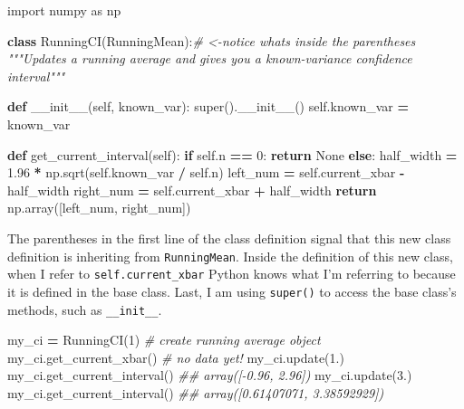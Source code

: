 \documentclass[
  12pt,
  krantz2]{krantz}
\makeatletter
\newenvironment{Shaded}{\begin{snugshade}}{\end{snugshade}}
\newcommand{\BuiltInTok}[1]{#1}
\newcommand{\CommentTok}[1]{\textcolor[rgb]{0.37,0.37,0.37}{\textit{#1}}}
\newcommand{\ControlFlowTok}[1]{\textcolor[rgb]{0.27,0.27,0.27}{\textbf{#1}}}
\newcommand{\DecValTok}[1]{\textcolor[rgb]{0.06,0.06,0.06}{#1}}
\newcommand{\FloatTok}[1]{\textcolor[rgb]{0.06,0.06,0.06}{#1}}
\newcommand{\FunctionTok}[1]{\textcolor[rgb]{0,0,0}{#1}}
\newcommand{\ImportTok}[1]{#1}
\newcommand{\KeywordTok}[1]{\textcolor[rgb]{0.27,0.27,0.27}{\textbf{#1}}}
\newcommand{\NormalTok}[1]{#1}
\newcommand{\OperatorTok}[1]{\textcolor[rgb]{0.43,0.43,0.43}{\textbf{#1}}}
\newcommand{\VariableTok}[1]{\textcolor[rgb]{0,0,0}{#1}}
\newenvironment{kframe}{%
\medskip{}
\setlength{\fboxsep}{.8em}
 \def\at@end@of@kframe{}%
 \ifinner\ifhmode%
  \def\at@end@of@kframe{\end{minipage}}%
  \begin{minipage}{\columnwidth}%
 \fi\fi%
 \def\FrameCommand##1{\hskip\@totalleftmargin \hskip-\fboxsep
 \colorbox{shadecolor}{##1}\hskip-\fboxsep
     \hskip-\linewidth \hskip-\@totalleftmargin \hskip\columnwidth}%
 \MakeFramed {\advance\hsize-\width
   \@totalleftmargin\z@ \linewidth\hsize
   \@setminipage}}%
 {\par\unskip\endMakeFramed%
 \at@end@of@kframe}
\renewenvironment{Shaded}{\begin{kframe}}{\end{kframe}}
\makeatother
\begin{document}
\begin{Shaded}
\begin{Highlighting}[]
\ImportTok{import}\NormalTok{ numpy }\ImportTok{as}\NormalTok{ np}

\KeywordTok{class}\NormalTok{ RunningCI(RunningMean):}\CommentTok{\# \textless{}{-}notice what\textquotesingle{}s inside the parentheses}
    \CommentTok{"""Updates a running average and }
\CommentTok{    gives you a known{-}variance confidence interval"""}
    
    \KeywordTok{def} \FunctionTok{\_\_init\_\_}\NormalTok{(}\VariableTok{self}\NormalTok{, known\_var):}
        \BuiltInTok{super}\NormalTok{().}\FunctionTok{\_\_init\_\_}\NormalTok{()}
        \VariableTok{self}\NormalTok{.known\_var }\OperatorTok{=}\NormalTok{ known\_var}
        
    \KeywordTok{def}\NormalTok{ get\_current\_interval(}\VariableTok{self}\NormalTok{):}
        \ControlFlowTok{if} \VariableTok{self}\NormalTok{.n }\OperatorTok{==} \DecValTok{0}\NormalTok{:}
            \ControlFlowTok{return} \VariableTok{None}
        \ControlFlowTok{else}\NormalTok{:}
\NormalTok{            half\_width }\OperatorTok{=} \FloatTok{1.96} \OperatorTok{*}\NormalTok{ np.sqrt(}\VariableTok{self}\NormalTok{.known\_var }\OperatorTok{/} \VariableTok{self}\NormalTok{.n)  }
\NormalTok{            left\_num }\OperatorTok{=} \VariableTok{self}\NormalTok{.current\_xbar }\OperatorTok{{-}}\NormalTok{ half\_width}
\NormalTok{            right\_num }\OperatorTok{=} \VariableTok{self}\NormalTok{.current\_xbar }\OperatorTok{+}\NormalTok{ half\_width}
            \ControlFlowTok{return}\NormalTok{ np.array([left\_num, right\_num])}
\end{Highlighting}
\end{Shaded}

The parentheses in the first line of the class definition signal that this new class definition is inheriting from \texttt{RunningMean}. Inside the definition of this new class, when I refer to \texttt{self.current\_xbar} Python knows what I'm referring to because it is defined in the base class. Last, I am using \texttt{super()} to access the base class's methods, such as \texttt{\_\_init\_\_}.

\begin{Shaded}
\begin{Highlighting}[]
\NormalTok{my\_ci }\OperatorTok{=}\NormalTok{ RunningCI(}\DecValTok{1}\NormalTok{) }\CommentTok{\# create running average object}
\NormalTok{my\_ci.get\_current\_xbar() }\CommentTok{\# no data yet!}
\NormalTok{my\_ci.update(}\FloatTok{1.}\NormalTok{) }
\NormalTok{my\_ci.get\_current\_interval() }
\CommentTok{\#\# array([{-}0.96,  2.96])}
\NormalTok{my\_ci.update(}\FloatTok{3.}\NormalTok{)  }
\NormalTok{my\_ci.get\_current\_interval()  }
\CommentTok{\#\# array([0.61407071, 3.38592929])}
\end{Highlighting}
\end{Shaded}
\end{document}
